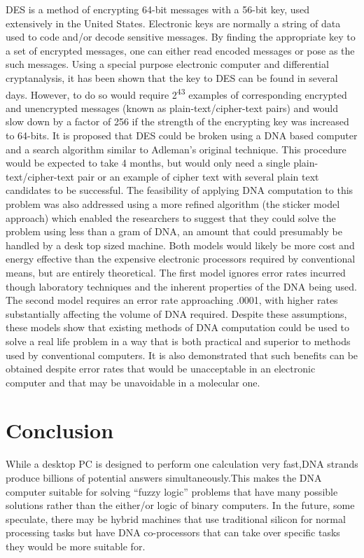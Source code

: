 \documentclass[a4paper]{article}
\begin{document}
DES is a method of encrypting 64-bit messages with a 56-bit key, used extensively in the United States. Electronic keys are normally a string of data used to code and/or decode sensitive messages. By finding the appropriate key to a set of encrypted messages, one can either read encoded messages or pose as the such messages. Using a special purpose electronic computer and differential cryptanalysis, it has been shown that the key to DES can be found in several days. However, to do so would require 2\textsuperscript{43} examples of corresponding encrypted and unencrypted messages (known as plain-text/cipher-text pairs) and would slow down by a factor of 256 if the strength of the encrypting key was increased to 64-bits. It is proposed that DES could be broken using a DNA based computer and a search algorithm similar to Adleman's original technique. This procedure would be expected to take 4 months, but would only need a single plain-text/cipher-text pair or an example of cipher text with several plain text candidates to be successful. The feasibility of applying DNA computation to this problem was also addressed  using a more refined algorithm (the sticker model approach) which enabled the researchers to suggest that they could solve the problem using less than a gram of DNA, an amount that could presumably be handled by a desk top sized machine. Both models would likely be more cost and energy effective than the expensive electronic processors required by conventional means, but are entirely theoretical. The first model ignores error rates incurred though laboratory techniques and the inherent properties of the DNA being used. The second model requires an error rate approaching .0001, with higher rates substantially affecting the volume of DNA required. Despite these assumptions, these models show that existing methods of DNA computation could be used to solve a real life problem in a way that is both practical and superior to methods used by conventional computers. It is also demonstrated that such benefits can be obtained despite error rates that would be unacceptable in an electronic computer and that may be unavoidable in a molecular one.


\section{Conclusion}

While  a  desktop  PC  is  designed  to  perform  one  calculation  very  fast,DNA  strands  produce  billions  of  potential  answers  simultaneously.This  makes  the  DNA  computer  suitable  for  solving  ``fuzzy  logic'' 
problems that have many possible solutions rather than the either/or logic of binary computers. In the future, some speculate, there may be hybrid  machines  that  use  traditional  silicon  for  normal  processing 
tasks  but  have  DNA  co-processors  that  can  take  over  specific  tasks they would be more suitable for. 
\end{document}
